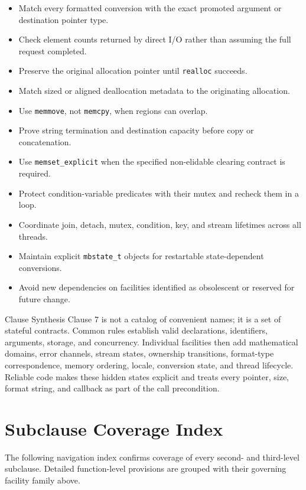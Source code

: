 \documentclass[10pt,letterpaper]{article}
\begin{document}
\begin{itemize}
  \item[$\square$] Match every formatted conversion with the exact promoted argument or destination pointer type.
  \item[$\square$] Check element counts returned by direct I/O rather than assuming the full request completed.
  \item[$\square$] Preserve the original allocation pointer until \texttt{realloc} succeeds.
  \item[$\square$] Match sized or aligned deallocation metadata to the originating allocation.
  \item[$\square$] Use \texttt{memmove}, not \texttt{memcpy}, when regions can overlap.
  \item[$\square$] Prove string termination and destination capacity before copy or concatenation.
  \item[$\square$] Use \texttt{memset\_explicit} when the specified non-elidable clearing contract is required.
  \item[$\square$] Protect condition-variable predicates with their mutex and recheck them in a loop.
  \item[$\square$] Coordinate join, detach, mutex, condition, key, and stream lifetimes across all threads.
  \item[$\square$] Maintain explicit \texttt{mbstate\_t} objects for restartable state-dependent conversions.
  \item[$\square$] Avoid new dependencies on facilities identified as obsolescent or reserved for future change.
\end{itemize}

\begin{CornellSummaryBox}{Clause Synthesis}
Clause 7 is not a catalog of convenient names; it is a set of stateful contracts. Common rules establish valid declarations, identifiers, arguments, storage, and concurrency. Individual facilities then add mathematical domains, error channels, stream states, ownership transitions, format-type correspondence, memory ordering, locale, conversion state, and thread lifecycle. Reliable code makes these hidden states explicit and treats every pointer, size, format string, and callback as part of the call precondition.
\end{CornellSummaryBox}


\section{Subclause Coverage Index}
The following navigation index confirms coverage of every second- and third-level subclause. Detailed function-level provisions are grouped with their governing facility family above.
\end{document}
